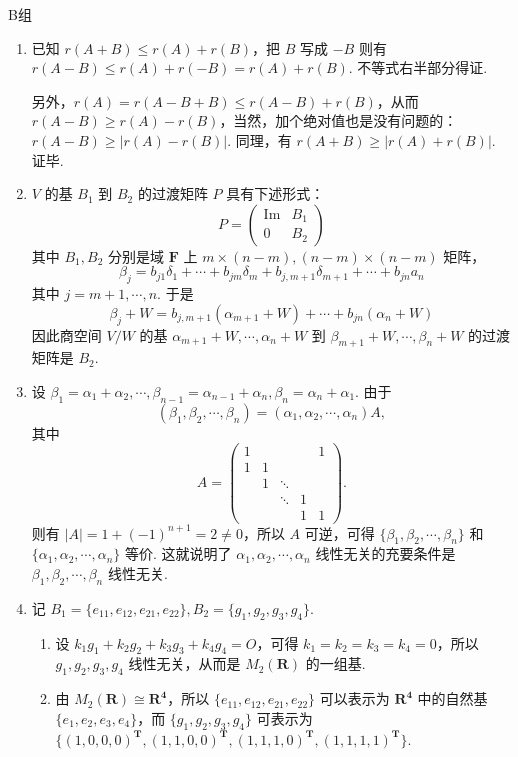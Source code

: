 \centerline{\heiti B组}
\begin{enumerate}
    \item 已知 $r(A+B) \leq r(A)+r(B)$，把 $B$ 写成 $-B$ 则有 $r(A-B) \leq r(A)+r(-B)=r(A)+r(B)$. 不等式右半部分得证.
    
    另外，$r(A)=r(A-B+B) \leq r(A-B)+r(B)$，从而 $r(A-B) \ge r(A)-r(B)$，当然，加个绝对值也是没有问题的：$r(A-B) \ge \lvert r(A)-r(B) \rvert$. 同理，有 $r(A+B) \ge \lvert r(A)+r(B) \rvert$. 证毕.
    \item $V$ 的基 $B_1$ 到 $B_2$ 的过渡矩阵 $P$ 具有下述形式：
    \[P=\begin{pmatrix}\mathrm{Im} & B_1 \\ 0 & B_2\end{pmatrix}\]
    其中 $B_1,B_2$ 分别是域 $\mathbf{F}$ 上 $m\times (n-m),(n-m)\times (n-m)$ 矩阵，
    \[\beta_j=b_{j1}\delta_1+\cdots+b_{jm}\delta_m+b_{j,m+1}\delta_{m+1}+\cdots+b_{jn}a_n\]
    其中 $j=m+1,\cdots,n$. 于是
    \[\beta_j+W=b_{j,m+1}(\alpha_{m+1}+W)+\cdots+b_{jn}(\alpha_n+W)\]
    因此商空间 $V/W$ 的基 $\alpha_{m+1}+W,\cdots,\alpha_n+W$ 到 $\beta_{m+1}+W,\cdots,\beta_n+W$ 的过渡矩阵是 $B_2$.
    \item 设 $\beta_1=\alpha_1+\alpha_2,\cdots,\beta_{n-1}=\alpha_{n-1}+\alpha_n,\beta_n=\alpha_n+\alpha_1$. 由于
    \[(\beta_1,\beta_2,\cdots,\beta_n) = (\alpha_1,\alpha_2,\cdots,\alpha_n)A,\]
    其中
    \[A=\begin{pmatrix}1 & & & & 1 \\ 1 & 1 & & & \\ & 1 & \ddots & & \\ & & \ddots & 1 & \\ & & & 1 & 1\end{pmatrix}.\]
    则有 $\lvert A \rvert = 1 + (-1)^{n+1}=2\neq 0$，所以 $A$ 可逆，可得 $\{\beta_1,\beta_2,\cdots,\beta_n\}$ 和 $\{\alpha_1,\alpha_2,\cdots,\alpha_n\}$ 等价. 这就说明了 $\alpha_1,\alpha_2,\cdots,\alpha_n$ 线性无关的充要条件是 $\beta_1,\beta_2,\cdots,\beta_n$ 线性无关.
    \item 记 $B_1=\{e_{11},e_{12},e_{21},e_{22}\},B_2=\{g_1,g_2,g_3,g_4\}$.\begin{enumerate}
        \item 设 $k_1g_1+k_2g_2+k_3g_3+k_4g_4=O$，可得 $k_1=k_2=k_3=k_4=0$，所以 $g_1,g_2,g_3,g_4$ 线性无关，从而是 $M_2(\mathbf{R})$ 的一组基.
        \item 由 $M_2(\mathbf{R}) \cong \mathbf{R^4}$，所以 $\{e_{11},e_{12},e_{21},e_{22}\}$ 可以表示为 $\mathbf{R^4}$ 中的自然基 $\{e_1,e_2,e_3,e_4\}$，而 $\{g_1,g_2,g_3,g_4\}$ 可表示为 $\{(1,0,0,0)^{\mathbf{T}},(1,1,0,0)^{\mathbf{T}},(1,1,1,0)^{\mathbf{T}},(1,1,1,1)^{\mathbf{T}}\}$.
        

\end{enumerate}
\end{enumerate}
